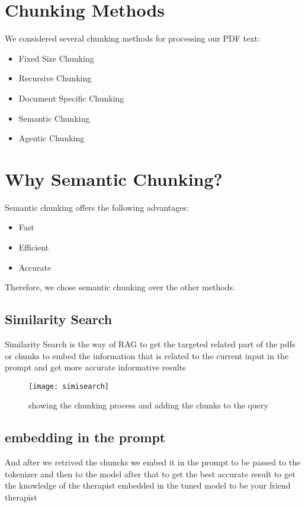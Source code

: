 \section*{Chunking Methods}

We considered several chunking methods for processing our PDF text:

\begin{itemize}
    \item Fixed Size Chunking
    \item Recursive Chunking
    \item Document Specific Chunking
    \item Semantic Chunking
    \item Agentic Chunking
\end{itemize}



\section*{Why Semantic Chunking?}

Semantic chunking offers the following advantages:
\begin{itemize}
    \item Fast
    \item Efficient
    \item Accurate
\end{itemize}
Therefore, we chose semantic chunking over the other methods.

\subsection{Similarity Search} 
Similarity Search is the way of RAG to get the targeted related part of the pdfs or chunks to embed the information that is related to the current input in the prompt and get more accurate informative results
\begin{figure}[h]
\texttt{[image: simisearch]}
\caption{showing the chunking process and adding the chunks to the query}
\centering
\end{figure}

\subsection{embedding in the prompt}
And after we retrived the chuncks we embed it in the prompt to be passed to the tokenizer and then to the model after that to get the best accurate result to get the knowledge of the therapist embedded in the tuned model to be your friend therapist



